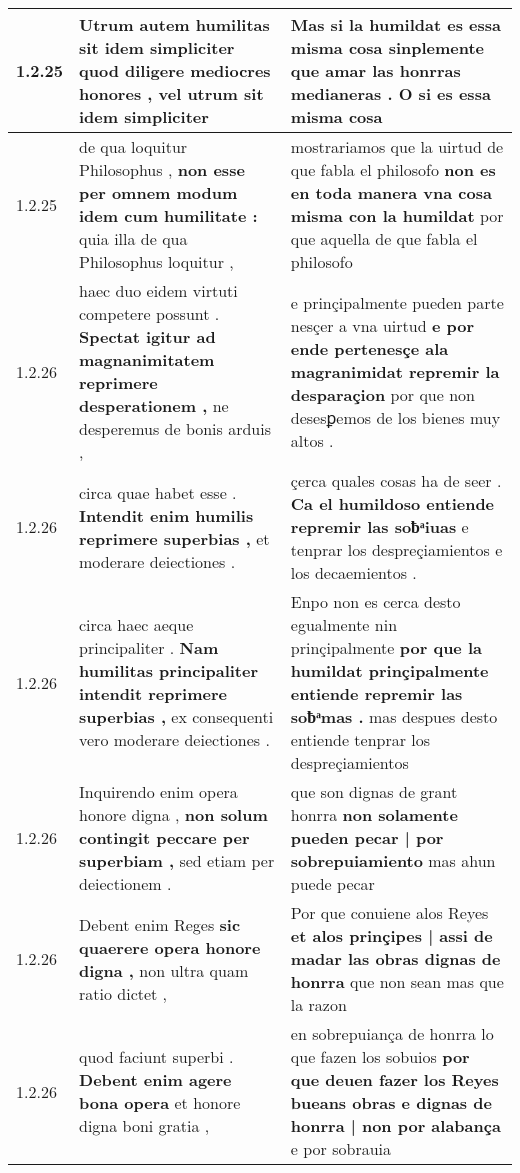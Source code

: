 \begin{tabular}{|p{1cm}|p{6.5cm}|p{6.5cm}|}
1.2.25 & Utrum autem humilitas sit idem simpliciter \textbf{ quod diligere mediocres honores , } vel utrum sit idem simpliciter & Mas si la humildat es essa misma cosa \textbf{ sinplemente que amar las honrras medianeras . } O si es essa misma cosa \\\hline
1.2.25 & de qua loquitur Philosophus , \textbf{ non esse per omnem modum idem cum humilitate : } quia illa de qua Philosophus loquitur , & mostrariamos que la uirtud de que fabla el philosofo \textbf{ non es en toda manera vna cosa misma con la humildat } por que aquella de que fabla el philosofo \\\hline
1.2.26 & haec duo eidem virtuti competere possunt . \textbf{ Spectat igitur ad magnanimitatem reprimere desperationem , } ne desperemus de bonis arduis , & e prinçipalmente pueden parte nesçer a vna uirtud \textbf{ e por ende pertenesçe ala magranimidat repremir la desparaçion } por que non desesꝑemos de los bienes muy altos . \\\hline
1.2.26 & circa quae habet esse . \textbf{ Intendit enim humilis reprimere superbias , } et moderare deiectiones . & çerca quales cosas ha de seer . \textbf{ Ca el humildoso entiende repremir las soƀͣiuas } e tenprar los despreçiamientos e los decaemientos . \\\hline
1.2.26 & circa haec aeque principaliter . \textbf{ Nam humilitas principaliter intendit reprimere superbias , } ex consequenti vero moderare deiectiones . & Enpo non es cerca desto egualmente nin prinçipalmente \textbf{ por que la humildat prinçipalmente entiende repremir las soƀͣmas . } mas despues desto entiende tenprar los despreçiamientos \\\hline
1.2.26 & Inquirendo enim opera honore digna , \textbf{ non solum contingit peccare per superbiam , } sed etiam per deiectionem . & que son dignas de grant honrra \textbf{ non solamente pueden pecar | por sobrepuiamiento } mas ahun puede pecar \\\hline
1.2.26 & Debent enim Reges \textbf{ sic quaerere opera honore digna , } non ultra quam ratio dictet , & Por que conuiene alos Reyes \textbf{ et alos prinçipes | assi de madar las obras dignas de honrra } que non sean mas que la razon \\\hline
1.2.26 & quod faciunt superbi . \textbf{ Debent enim agere bona opera } et honore digna boni gratia , & en sobrepuiança de honrra lo que fazen los sobuios \textbf{ por que deuen fazer los Reyes bueans obras e dignas de honrra | non por alabança } e por sobrauia \\\hline

\end{tabular}
